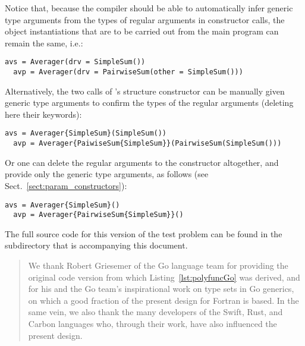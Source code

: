 \documentclass[11pt,oneside]{report}
\newcommand{\code}[1]{{\selectfont\ttfamily{#1}}}
\begin{document}
Notice that, because the compiler should be able to automatically
infer generic type arguments from the types of regular arguments in
constructor calls, the object instantiations that are to be carried
out from the main program can remain the same, i.e.:
\begin{lstlisting}[language=LFortran,style=boxed]
  avs = Averager(drv = SimpleSum())
  avp = Averager(drv = PairwiseSum(other = SimpleSum()))
\end{lstlisting}
Alternatively, the two calls of \code{Averager}'s structure
constructor can be manually given generic type arguments to confirm
the types of the regular arguments (deleting here their keywords):
\begin{lstlisting}[language=LFortran,style=boxed]
  avs = Averager{SimpleSum}(SimpleSum())
  avp = Averager{PaiwiseSum{SimpleSum}}(PairwiseSum(SimpleSum()))
\end{lstlisting}
Or one can delete the regular arguments to the constructor
altogether, and provide only the generic type arguments, as follows
(see Sect.~\ref{sect:param_constructors}):
\begin{lstlisting}[language=LFortran,style=boxed]
  avs = Averager{SimpleSum}()
  avp = Averager{PairwiseSum{SimpleSum}}()
\end{lstlisting}
The full source code for this version of the test problem can be found
in the \code{Code} subdirectory that is accompanying this document.




\renewcommand{\abstractname}{Acknowledgements}

\begin{abstract}
We thank Robert Griesemer of the Go language team for providing the
original code version from which Listing~\ref{lst:polyfuncGo} was
derived, and for his and the Go team's inspirational work on type sets
in Go generics, on which a good fraction of the present design for
Fortran is based. In the same vein, we also thank the many developers
of the Swift, Rust, and Carbon languages who, through their work, have
also influenced the present design.
\end{abstract}
\end{document}
